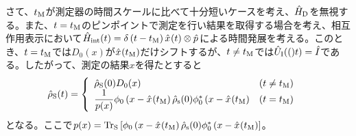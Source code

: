 \documentclass[10pt, a4paper]{jsarticle}
\begin{document}
さて、$t_{\rm M}$が測定器の時間スケールに比べて十分短いケースを考え、$\hat{H}_{\rm D}$を無視する。また、$t = t_{\rm M}$のピンポイントで測定を行い結果を取得する場合を考え、相互作用表示において$\hat{H}_{\rm int}(t) = \delta \left( t - t_{\rm M} \right) \hat{x}_{}(t) \otimes \hat{p}_{}$による時間発展を考える。このとき、$t = t_{\rm M}$では$D_{0}(x)$が$\hat{x}_{}(t_{\rm M})$だけシフトするが、$t \neq t_{\rm M}$では$\hat{U}_{\rm I}(()t) = \hat{I}_{\rm }$である。したがって、測定の結果$x$を得たとすると
\begin{equation}
\begin{split}
\label{eq:230}
	\hat{\rho}_{\rm S}(t) &= \left\{
		\begin{array}{ll}
			\hat{\rho}_{\rm S}(0) D_{0}(x) & (t \neq t_{\rm M}) \\
			\dfrac{1}{p(x)} \phi_{0} \left( x - \hat{x}_{}(t_{\rm M} \right) \hat{\rho}_{\rm s}(0) \phi_{0}^{*} \left( x - \hat{x}_{}(t_{\rm M} \right) & (t = t_{\rm M})
		\end{array}
		\right.
\end{split}
\end{equation}
となる。ここで$p(x) = {\rm Tr}_{\rm S}\left[ \phi_{0} \left( x - \hat{x}_{}(t_{\rm M} \right) \hat{\rho}_{\rm s}(0) \phi_{0}^{*} \left( x - \hat{x}_{}(t_{\rm M} \right) \right]$。
\end{document}
